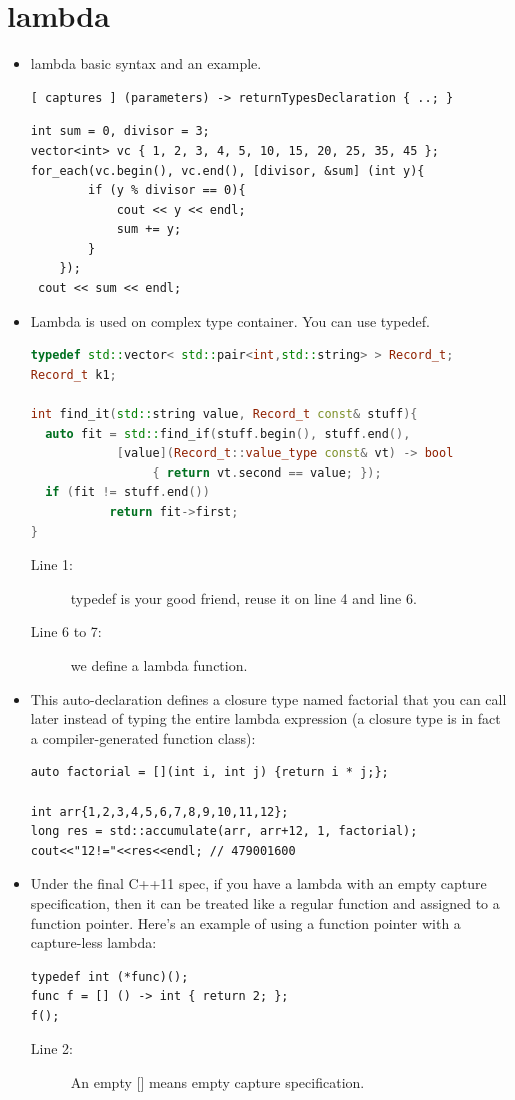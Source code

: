 \documentclass[a4paper,11pt,twoside]{book}
\begin{document}
\section{lambda}

\begin{itemize}
\item lambda basic syntax and an example.
\begin{lstlisting}
[ captures ] (parameters) -> returnTypesDeclaration { ..; }
\end{lstlisting}

\begin{lstlisting}
int sum = 0, divisor = 3;
vector<int> vc { 1, 2, 3, 4, 5, 10, 15, 20, 25, 35, 45 };
for_each(vc.begin(), vc.end(), [divisor, &sum] (int y){
		if (y % divisor == 0){
			cout << y << endl;
			sum += y;
		}
	});
 cout << sum << endl;
\end{lstlisting}

\item Lambda is used on complex type container. You can use typedef.
\begin{lstlisting}[frame=single, language=c++, mathescape=true]
typedef std::vector< std::pair<int,std::string> > Record_t;
Record_t k1;

int find_it(std::string value, Record_t const& stuff){
  auto fit = std::find_if(stuff.begin(), stuff.end(),
            [value](Record_t::value_type const& vt) -> bool
                 { return vt.second == value; });
  if (fit != stuff.end())
           return fit->first;
}
\end{lstlisting}
\begin{description}
	\item[Line 1:] typedef is your good friend, reuse it on line 4 and line 6.
	\item[Line 6 to 7:] we define a lambda function.
\end{description}
\item This auto-declaration defines a closure type named factorial that you can call later instead of typing the entire lambda expression (a closure type is in fact a compiler-generated function class):
\begin{lstlisting}[numbers=none]
auto factorial = [](int i, int j) {return i * j;};

int arr{1,2,3,4,5,6,7,8,9,10,11,12};
long res = std::accumulate(arr, arr+12, 1, factorial);
cout<<"12!="<<res<<endl; // 479001600
\end{lstlisting}

\item Under the final C++11 spec, if you have a lambda with an empty capture specification, then it can be treated like a regular function and assigned to a function pointer. Here's an example of using a function pointer with a capture-less lambda:
\begin{lstlisting}[numbers=none]
typedef int (*func)();
func f = [] () -> int { return 2; };
f();
\end{lstlisting}
\begin{description}
	\item[Line 2:] An empty [] means empty capture specification.
\end{description}


\end{itemize}
\end{document}
